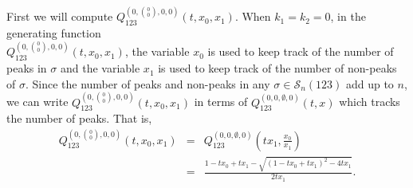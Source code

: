 \documentclass[
final,nomarks
]{dmtcs-episciences}
\newcommand{\Sn}[1]{\mathcal{S}_{#1}}
\newcommand{\Qm}[1]{Q_{123}^{(#1)}(t,x)}
\newcommand{\Qmx}[2]{Q_{123}^{(#1)}(#2)}
\newcommand{\Qmz}[2]{Q_{123}^{(0,\binom{#1}{#2},0,0)}(t,x_0,x_1)}
\begin{document}
First we will compute  \begin{math}\Qmz{0}{0}\end{math}. 
When \begin{math}k_1=k_2=0\end{math}, in the generating function\\ \begin{math}\Qmz{0}{0}\end{math}, 
the variable \begin{math}x_0\end{math} is used to keep track of the number of peaks  in \begin{math}\sigma\end{math} and 
the variable \begin{math}x_1\end{math} is used to keep track of the number of non-peaks of \begin{math}\sigma\end{math}.  
Since the number of peaks and non-peaks in any \begin{math}\sigma \in \Sn{n}(123)\end{math} 
add up to \begin{math}n\end{math}, we can write \begin{math}\Qmz{0}{0}\end{math} in terms of \begin{math}\Qm{0,0,\emptyset,0}\end{math} which tracks the number of peaks.  That is, 
\begin{eqnarray}
	\Qmz{0}{0}&=&\Qmx{0,0,\emptyset,0}{t x_1,\frac{x_0}{x_1}}\nonumber\\
	&=&\frac{1-t x_0+t x_1 -\sqrt{(1-t x_0+t x_1)^2-4 t x_1}}{2 t x_1}.
\end{eqnarray}
\end{document}
